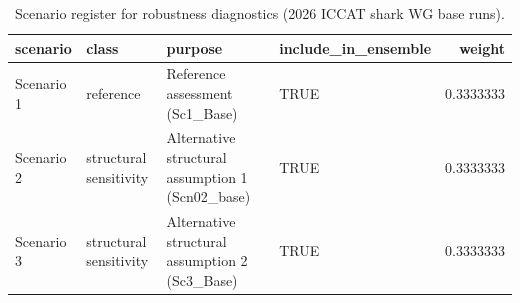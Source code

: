 \begin{table}

\caption{\label{tab:robustness-scenarios}Scenario register for robustness diagnostics (2026 ICCAT shark WG base runs).}
\centering
\begin{tabular}[t]{llllr}
\toprule
scenario & class & purpose & include\_in\_ensemble & weight\\
\midrule
Scenario 1 & reference & Reference assessment (Sc1\_Base) & TRUE & 0.3333333\\
Scenario 2 & structural sensitivity & Alternative structural assumption 1 (Scn02\_base) & TRUE & 0.3333333\\
Scenario 3 & structural sensitivity & Alternative structural assumption 2 (Sc3\_Base) & TRUE & 0.3333333\\
\bottomrule
\end{tabular}
\end{table}
